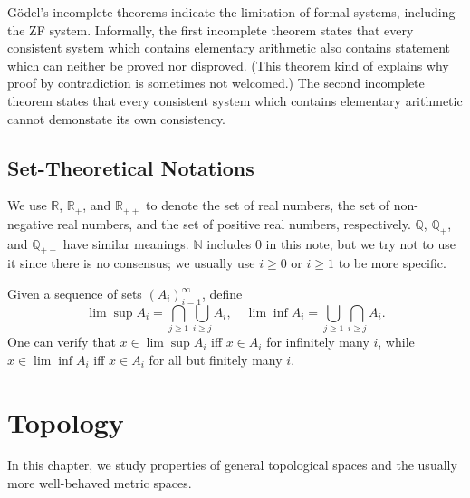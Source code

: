 \documentclass[openany]{book}
\theoremstyle{definition}
\theoremstyle{remark}
\begin{document}
G\"{o}del's incomplete theorems indicate the limitation of formal systems, including the ZF system. Informally, the first incomplete theorem states that every consistent system which contains elementary arithmetic also contains statement which can neither be proved nor disproved. (This theorem kind of explains why proof by contradiction is sometimes not welcomed.) The second incomplete theorem states that every consistent system which contains elementary arithmetic cannot demonstate its own consistency.

\section{Set-Theoretical Notations}
We use $\mathbb{R}$, $\mathbb{R}_+$, and $\mathbb{R}_{++}$ to denote the set of real numbers, the set of non-negative real numbers, and the set of positive real numbers, respectively. $\mathbb{Q}$, $\mathbb{Q}_+$, and $\mathbb{Q}_{++}$ have similar meanings. $\mathbb{N}$ includes $0$ in this note, but we try not to use it since there is no consensus; we usually use $i\ge0$ or $i\ge1$ to be more specific.

Given a sequence of sets $(A_i)_{i=1}^{\infty}$, define
\begin{equation*}
    \lim\sup A_i=\bigcap_{j\ge1}\bigcup_{i\ge j}A_i,\quad\lim\inf A_i=\bigcup_{j\ge1}\bigcap_{i\ge j}A_i.
\end{equation*}
One can verify that $x\in\lim\sup A_i$ iff $x\in A_i$ for infinitely many $i$, while $x\in\lim\inf A_i$ iff $x\in A_i$ for all but finitely many $i$.

\chapter{Topology}
In this chapter, we study properties of general topological spaces and the usually more well-behaved metric spaces.
\end{document}
